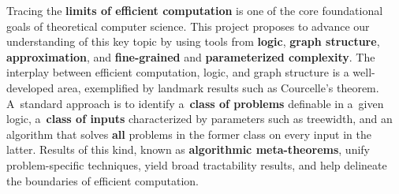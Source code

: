 \documentclass[a4paper,11pt]{article}
\newcommand{\giannos}[1]{\noindent{\bf {\color{violet}{\sc Giannos:}  #1}}}
\begin{document}
Tracing the \textbf{limits of efficient computation} is one of the core
foundational goals of theoretical computer science. This project proposes
to advance our understanding of this key topic by using tools from
\textbf{logic}, \textbf{graph structure}, \textbf{approximation}, and
\textbf{fine-grained} and \textbf{parameterized complexity}. 
The interplay between efficient computation, logic, and graph structure is a well-developed area, exemplified by landmark results such as Courcelle's theorem.
A~standard approach is to identify a~\textbf{class of problems} definable in a~given logic, a~\textbf{class of inputs} characterized by parameters such as treewidth, and an algorithm that solves \textbf{all} problems in the former class on every input in the latter.
Results of this kind, known as \textbf{algorithmic meta-theorems}, unify problem-specific techniques, yield broad tractability results, and help delineate the boundaries of efficient computation.

\end{document}

